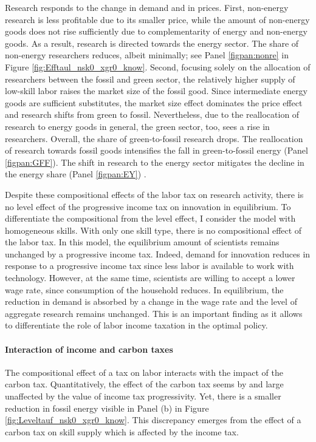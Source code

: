  
 Research responds to the change in demand and in prices. First, non-energy research is less profitable due to its smaller price, while the amount of non-energy goods does not rise sufficiently due to complementarity of energy and non-energy goods. As a result, research is directed towards the energy sector. The share of non-energy researchers reduces, albeit minimally; see Panel \eqref{figpan:nonre} in Figure \ref{fig:Efftaul_nsk0_xgr0_know}. %
 Second, focusing solely on the allocation of researchers between the fossil and green sector, the relatively higher supply of low-skill labor raises the market size of the fossil good. Since intermediate energy goods are sufficient substitutes, the market size effect dominates the price effect and research shifts from green to fossil. Nevertheless, due to the reallocation of research to energy goods in general, the green sector, too, sees a rise in researchers. Overall, the share of green-to-fossil research drops. The reallocation of research towards fossil goods intensifies the fall in green-to-fossil energy (Panel \eqref{figpan:GFF}). The shift in research to the energy sector mitigates the decline in the energy share (Panel \eqref{figpan:EY}) . 
 
 Despite these compositional effects of the labor tax on research activity, there 
 is no level effect of the progressive income tax on innovation in equilibrium. To differentiate the compositional from the level effect, I consider the model with homogeneous skills. With only one skill type, there is no compositional effect of the labor tax. In this model, the equilibrium amount of scientists remains unchanged by a progressive income tax. Indeed, demand for innovation reduces in response to a progressive income tax since less labor is available to work with technology. However, at the same time, scientists are willing to accept a lower wage rate, since consumption of the household reduces. In equilibrium, the reduction in demand is absorbed by a change in the wage rate and the level of aggregate research remains unchanged. 
 This is an important finding as it allows to differentiate the role of labor income taxation in the optimal policy.  
 
 
  
\paragraph{Interaction of income and carbon taxes}
The compositional effect of a tax on labor interacts with the impact of the carbon tax.
  Quantitatively, the effect of the carbon tax seems by and large unaffected by the value of income tax progressivity.
 Yet, there is a smaller reduction in fossil energy visible in Panel (b) in Figure \ref{fig:Leveltauf_nsk0_xgr0_know}.
This discrepancy emerges from the effect of a carbon tax on skill supply which is affected by the income tax. 

